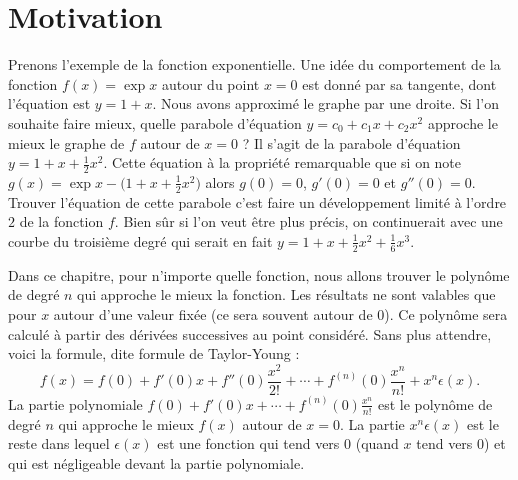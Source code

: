 \documentclass[class=report,crop=false]{standalone}
\begin{document}






\section*{Motivation}

Prenons l'exemple de la fonction exponentielle.
Une idée du comportement de la fonction $f(x)=\exp x$ autour du point $x=0$ est donné par sa tangente,
dont l'équation est $y=1+x$. Nous avons approximé le graphe par une droite.
Si l'on souhaite faire mieux, quelle parabole d'équation $y = c_0 + c_1x + c_2 x^2$ approche le mieux
le graphe de $f$ autour de $x=0$ ? Il s'agit de la parabole d'équation $y=1+x+\frac12 x^2$.
Cette équation à la propriété remarquable que si on note $g(x)=\exp x - \big(1+x+\frac12 x^2\big)$ alors
$g(0)=0$, $g'(0)=0$ et $g''(0)=0$. Trouver l'équation de cette parabole c'est faire un développement limité à l'ordre $2$
de la fonction $f$.
Bien sûr si l'on veut être plus précis, on continuerait avec une courbe du troisième degré
qui serait en fait $y = 1+x+\frac12 x^2 + \frac16 x^3$.


\bigskip

Dans ce chapitre, pour n'importe quelle fonction, nous allons trouver le polynôme de degré $n$
qui approche le mieux la fonction. Les résultats ne sont valables que pour $x$ autour d'une valeur
fixée (ce sera souvent autour de $0$). Ce polynôme sera calculé à partir des dérivées successives au point
considéré. Sans plus attendre, voici la formule, dite formule de Taylor-Young :
$$f(x)= f(0)+f'(0)x+f''(0)\frac{x^2}{2!}+\cdots
+f^{(n)}(0)\frac{x^n}{n!} + x^n\epsilon(x).$$
La partie polynomiale $f(0)+f'(0)x+\cdots+f^{(n)}(0)\frac{x^n}{n!}$
est le polynôme de degré $n$ qui approche le mieux $f(x)$ autour de $x=0$.
La partie $x^n\epsilon(x)$ est le \og reste \fg{}  dans lequel $\epsilon(x)$ est une fonction
qui tend vers $0$ (quand $x$ tend vers $0$) et qui est négligeable devant la partie polynomiale.
\end{document}
